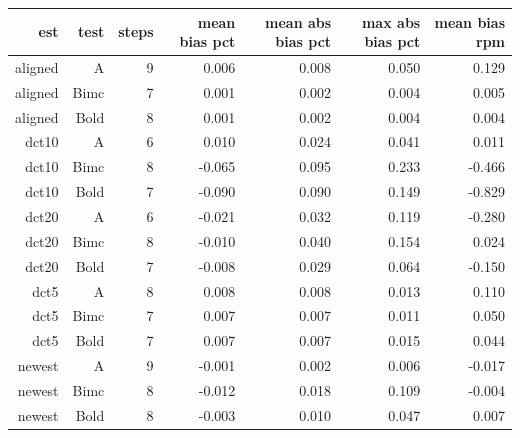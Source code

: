 \begin{tabular}{@{}rrrrrrr@{}}
\toprule
est & test & steps & mean bias pct & mean abs bias pct & max abs bias pct & mean bias rpm \\
\midrule
aligned & A & 9 & 0.006 & 0.008 & 0.050 & 0.129 \\
aligned & Bimc & 7 & 0.001 & 0.002 & 0.004 & 0.005 \\
aligned & Bold & 8 & 0.001 & 0.002 & 0.004 & 0.004 \\
dct10 & A & 6 & 0.010 & 0.024 & 0.041 & 0.011 \\
dct10 & Bimc & 8 & -0.065 & 0.095 & 0.233 & -0.466 \\
dct10 & Bold & 7 & -0.090 & 0.090 & 0.149 & -0.829 \\
dct20 & A & 6 & -0.021 & 0.032 & 0.119 & -0.280 \\
dct20 & Bimc & 8 & -0.010 & 0.040 & 0.154 & 0.024 \\
dct20 & Bold & 7 & -0.008 & 0.029 & 0.064 & -0.150 \\
dct5 & A & 8 & 0.008 & 0.008 & 0.013 & 0.110 \\
dct5 & Bimc & 7 & 0.007 & 0.007 & 0.011 & 0.050 \\
dct5 & Bold & 7 & 0.007 & 0.007 & 0.015 & 0.044 \\
newest & A & 9 & -0.001 & 0.002 & 0.006 & -0.017 \\
newest & Bimc & 8 & -0.012 & 0.018 & 0.109 & -0.004 \\
newest & Bold & 8 & -0.003 & 0.010 & 0.047 & 0.007 \\
\bottomrule
\end{tabular}

